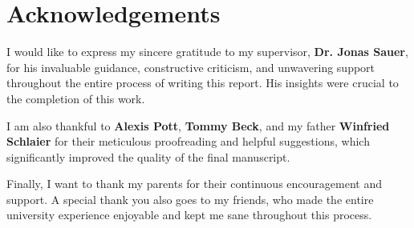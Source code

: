 \chapter*{Acknowledgements}
I would like to express my sincere gratitude to my supervisor, \textbf{Dr. Jonas Sauer}, for his invaluable guidance, constructive criticism, and unwavering support throughout the entire process of writing this report. His insights were crucial to the completion of this work.

I am also thankful to \textbf{Alexis Pott}, \textbf{Tommy Beck}, and my father \textbf{Winfried Schlaier} for their meticulous proofreading and helpful suggestions, which significantly improved the quality of the final manuscript.

Finally, I want to thank my parents for their continuous encouragement and support.
A special thank you also goes to my friends, who made the entire university experience enjoyable and kept me sane throughout this process.



